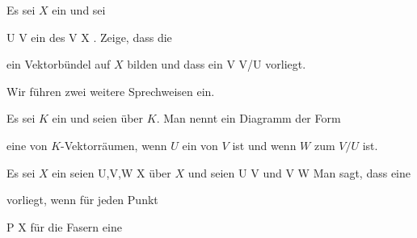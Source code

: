 {}
{

Es sei $X$ ein
und sei

\mavergleichskette
{\vergleichskette
{ U
}
{ \subseteq }{ V
}
{  }{
}
{    }{
}
{   }{
}
}
{}{}{}
ein
des
\maabb {} { V } { X
} {.}
Zeige, dass die
 {} {}

 ein Vektorbündel auf $X$ bilden und dass ein
\maabb {} { V } { V/U
} {}
vorliegt.

}
{} {}

Wir führen zwei weitere Sprechweisen ein.

Es sei $K$ ein
und seien
über $K$. Man nennt ein Diagramm der Form

 {  }

eine  von $K$-Vektorräumen, wenn $U$ ein
von $V$ ist und wenn $W$
zum
$V/U$ ist.

Es sei $X$ ein
seien
\maabbdisp {} {U,V,W} {X
} {}
über $X$ und seien
\maabb {\varphi} { U } { V
} {}
und
\maabb {\psi} { V } { W
} {}
Man sagt, dass eine

 {  }

vorliegt, wenn für jeden Punkt

\mavergleichskette
{\vergleichskette
{ P
}
{ \in }{ X
}
{  }{
}
{    }{
}
{   }{
}
}
{}{}{}
für die Fasern eine

 {  }

